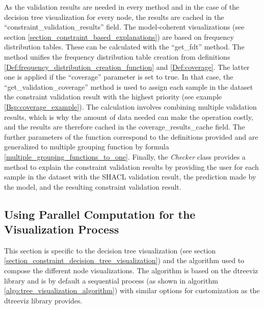 As the validation results are needed in every method and in the case of the decision tree visualization for every node, the results are cached in the ``constraint\_validation\_results'' field.
The model-coherent visualizations (see section \ref{section_constraint_based_explanations}) are based on frequency distribution tables. These can be calculated with the ``get\_fdt'' method. The method unifies the frequency distribution table creation from definitions \ref{Def:frequency_distribution_creation_function} and \ref{Def:coverage}. The latter one is applied if the ``coverage'' parameter is set to true. In that case, the ``get\_validation\_coverage'' method is used to assign each sample in the dataset the constraint validation result with the highest priority (see example \ref{Bsp:coverage_example}). The calculation involves combining multiple validation results, which is why the amount of data needed can make the operation costly, and the results are therefore cached in the \glqq coverage\_results\_cache\grqq{} field. The further parameters of the function correspond to the definitions provided and are generalized to multiple grouping function by formula \ref{multiple_grouping_functions_to_one}.
Finally, the \emph{Checker} class provides a method to explain the constraint validation results by providing the user for each sample in the dataset with the SHACL validation result, the prediction made by the model, and the resulting constraint validation result.

\subsection{Using Parallel Computation for the Visualization Process}
\label{section_parallel_computation}
This section is specific to the decision tree visualization (see section \ref{section_constraint_decision_tree_visualization}) and the algorithm used to compose the different node visualizations. The algorithm is based on the dtreeviz library \cite{dtreeviz} and is by default a sequential process (as shown in algorithm \ref{algo:tree_visualization_algorithm}) with similar options for customization as the dtreeviz library provides. 

